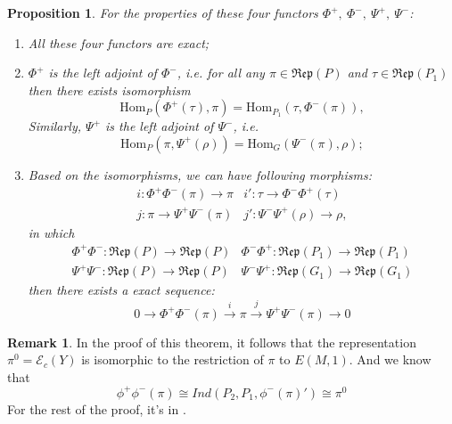 \documentclass[12pt,a4paper,english]{article}
\theoremstyle{plain}
\newtheorem{prop}[thm]{Proposition}
\theoremstyle{definition}
\newtheorem*{rem}{Remark}
\begin{document}
\begin{prop}
For the properties of these four functors $\Phi^{+},\ \Phi^{-},\ \Psi^{+}, \ \Psi^{-}$:
\begin{enumerate}
    \item All these four functors are exact;
    \item $\Phi^{+}$ is the left adjoint of $\Phi^{-}$, i.e. for all any $\pi\in\mathfrak{Rep}(P)$ and $\tau\in \mathfrak{Rep}(P_{1})$ then there exists isomorphism 
    \begin{equation*}
        \text{Hom}_{P}(\Phi^{+}(\tau),\pi)=\text{Hom}_{P_{1}}(\tau,\Phi^{-}(\pi)),
    \end{equation*}
    Similarly, $\Psi^{+}$ is the left adjoint of $\Psi^{-}$, i.e. 
    \begin{equation*}
        \text{Hom}_{P}(\pi,\Psi^{+}(\rho))=\text{Hom}_{G}(\Psi^{-}(\pi),\rho);
    \end{equation*}
    \item Based on the isomorphisms, we can have following morphisms: 
\begin{align*}
    i: \Phi^{+}\Phi^{-}(\pi)\rightarrow  \pi & i':\tau\rightarrow \Phi^{-}\Phi^{+}(\tau)\\
    j: \pi\rightarrow \Psi^{+}\Psi^{-}(\pi)& j':\Psi^{-}\Psi^{+}(\rho)\rightarrow \rho,
\end{align*}
in which 
\begin{align*}
    \Phi^{+}\Phi^{-}:\mathfrak{Rep}(P)\rightarrow \mathfrak{Rep}(P) & \Phi^{-}\Phi^{+}:\mathfrak{Rep}(P_{1})\rightarrow \mathfrak{Rep}(P_{1})\\
    \Psi^{+}\Psi^{-}: \mathfrak{Rep}(P)\rightarrow \mathfrak{Rep}(P) & \Psi^{-}\Psi^{+}: \mathfrak{Rep}(G_{1})\rightarrow \mathfrak{Rep}(G_{1})
\end{align*}
then there exists a exact sequence:
\begin{equation*}
    0\rightarrow \Phi^{+}\Phi^{-}(\pi)\xrightarrow{i}\pi \xrightarrow{j} \Psi^{+}\Psi^{-}(\pi)\rightarrow 0
\end{equation*}
\end{enumerate}

\end{prop}
\begin{rem}\label{BZ}
In the proof of this theorem, it follows that the representation $\pi^{0}=\mathcal{E}_{c}(Y)$ is isomorphic to the restriction of $\pi$ to $E(M,1)$. And we know that 
\begin{equation*}
    \phi^{+}\phi^{-}(\pi)\cong Ind(P_{2},P_{1},\phi^{-}(\pi)')\cong\pi^{0}
\end{equation*}
For the rest of the proof, it's in \cite{bernstein1976representations}.

\end{rem}
\end{document}
